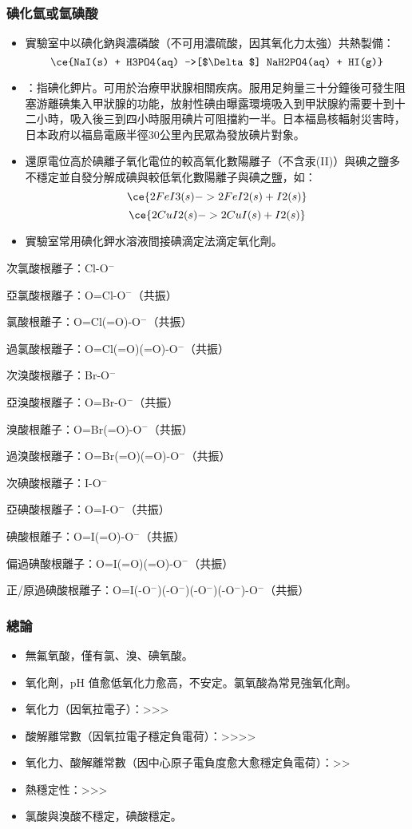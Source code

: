 \documentclass[a4paper,12pt]{report}
\begin{document}
\subsubsection{碘化氫或氫碘酸}
\begin{itemize}
\item 實驗室中以碘化鈉與濃磷酸（不可用濃硫酸，因其氧化力太強）共熱製備：
\[\ce{NaI(s) + H3PO4(aq) ->[$\Delta$] NaH2PO4(aq) + HI(g)}\]
\item {}：指碘化鉀片。可用於治療甲狀腺相關疾病。服用足夠量三十分鐘後可發生阻塞游離碘集入甲狀腺的功能，放射性碘由曝露環境吸入到甲狀腺約需要十到十二小時，吸入後三到四小時服用碘片可阻擋約一半。日本福島核輻射災害時，日本政府以福島電廠半徑30公里內民眾為發放碘片對象。
\item 還原電位高於碘離子氧化電位的較高氧化數陽離子（不含汞(II)）與碘之鹽多不穩定並自發分解成碘與較低氧化數陽離子與碘之鹽，如：
\[\ce{2FeI3(s) -> 2FeI2(s) + I2(s)}\]
\[\ce{2CuI2(s) -> 2CuI(s) + I2(s)}\]
\item 實驗室常用碘化鉀水溶液間接碘滴定法滴定氧化劑。
\end{itemize}
\bit
\item 次氯酸根離子：Cl-O$^-$
\item 亞氯酸根離子：O=Cl-O$^-$（共振）
\item 氯酸根離子：O=Cl(=O)-O$^-$（共振）
\item 過氯酸根離子：O=Cl(=O)(=O)-O$^-$（共振）
\item 次溴酸根離子：Br-O$^-$
\item 亞溴酸根離子：O=Br-O$^-$（共振）
\item 溴酸根離子：O=Br(=O)-O$^-$（共振）
\item 過溴酸根離子：O=Br(=O)(=O)-O$^-$（共振）
\item 次碘酸根離子：I-O$^-$
\item 亞碘酸根離子：O=I-O$^-$（共振）
\item 碘酸根離子：O=I(=O)-O$^-$（共振）
\item 偏過碘酸根離子：O=I(=O)(=O)-O$^-$（共振）
\item 正/原過碘酸根離子：O=I(-O$^-$)(-O$^-$)(-O$^-$)(-O$^-$)-O$^-$（共振）
\eit
\subsubsection{總論}
\begin{itemize}
\item 無氟氧酸，僅有氯、溴、碘氧酸。
\item 氧化劑，pH 值愈低氧化力愈高，不安定。氯氧酸為常見強氧化劑。
\item 氧化力（因氧拉電子）：>>>
\item 酸解離常數（因氧拉電子穩定負電荷）：>>>>
\item 氧化力、酸解離常數（因中心原子電負度愈大愈穩定負電荷）：>>
\item 熱穩定性：>>>
\item 氯酸與溴酸不穩定，碘酸穩定。
\end{itemize}
\end{document}

